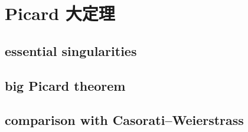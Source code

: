 \section{Picard 大定理}
\label{b3:sec:1405}


\subsection{essential singularities}
\label{b3:subsec:140501}

\subsection{big Picard theorem}
\label{b3:subsec:140502}

\subsection{comparison with Casorati–Weierstrass}
\label{b3:subsec:140503}


